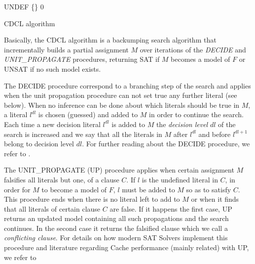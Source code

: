 \begin{algorithm}[h]
\SetLine
{}
 \BlankLine
 \Status \assign UNDEF\;
 \Model \assign \{\}\;
 \Dl \assign $0$\;
 \Return \Status
 \caption{CDCL algorithm}
 \label{alg:cdcl}
\end{algorithm}

Basically, the CDCL algorithm is a backumping search algorithm that
incrementally builds a partial assignment $M$ over iterations of the
\emph{DECIDE} and \emph{UNIT\_PROPAGATE} procedures, returning SAT if
$M$ becomes a model of $F$ or UNSAT if no such model exists.

The DECIDE procedure correspond to a branching step of the search and
applies when the unit propagation procedure can not set true any
further literal (see below).  When no inference can be done about
which literals should be true in $M$, a literal $l^{dl}$ is chosen
(guessed) and added to $M$ in order to continue the search.  Each time
a new decision literal $l^{dl}$ is added to $M$ the \emph{ decision
  level} $dl$ of the search is increased and we say that all the
literals in $M$ after $l^{dl}$ and before $l^{dl+1}$ belong to
decision level $dl$.  For further reading about the DECIDE procedure,
we refer to \cite{Chaff2001,MiniSat,rsat}.

The UNIT\_PROPAGATE (UP) procedure applies when certain assignment $M$
falsifies all literals but one, of a clause $C$.  If $l$ is the
undefined literal in $C$, in order for $M$ to become a model of $F$,
$l$ must be added to $M$ so as to satisfy $C$. This procedure ends
when there is no literal left to add to $M$ or when it finds that all
literals of certain clause $C$ are false.  If it happens the first
case, UP returns an updated model containing all such propagations and
the search continues.  In the second case it returns the falsified
clause which we call a \emph{conflicting clause}.  For details on how
modern SAT Solvers implement this procedure and literature regarding
Cache performance (mainly related) with UP, we refer to
\cite{Chaff2001,ZhangMalik2003SAT}
 

